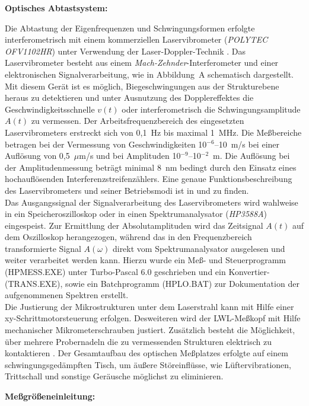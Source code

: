 {\bf Optisches Abtastsystem:}

Die Abtastung der Eigenfrequenzen und Schwingungsformen erfolgte
interferometrisch mit einem kommerziellen Laservibrometer
({\em POLYTEC OFV1102HR}) unter Verwendung der Laser-Doppler-Technik
\cite{Pol91}. Das Laservibrometer besteht aus einem
{\em Mach-Zehnder}-Interferometer und einer elektronischen
Signalverarbeitung, wie in Abbildung~A schematisch dargestellt.
Mit diesem Gerät ist es möglich, Biegeschwingungen aus der Strukturebene
heraus zu detektieren und unter Ausnutzung des Dopplereffektes die
Geschwindigkeitsschnelle $v(t)$ oder interferometrisch die
Schwingungsamplitude $A(t)$ zu vermessen.
Der Arbeitsfrequenzbereich des eingesetzten Laservibrometers erstreckt
sich von 0,1~Hz bis maximal 1~MHz. Die Meßbereiche betragen bei der
Vermessung von Geschwindigkeiten 10$^{-6}$--10~m/s bei einer Auflösung
von 0,5~$\mu$m/s und bei Amplituden 10$^{-9}$--10$^{-2}$~m. Die Auflösung
bei der Amplitudenmessung beträgt minimal 8~nm bedingt durch den Einsatz
eines hochauflösenden Interferenzstreifenzählers. Eine genaue
Funktionsbeschreibung des Laservibrometers und seiner Betriebsmodi ist in
\cite{Sel88} und \cite{Lew90} zu finden.\\
Das Ausgangssignal der Signalverarbeitung des Laservibrometers wird
wahlweise in ein Speicheroszilloskop oder in einen Spektrumanalysator
({\em HP3588A}) eingespeist. Zur Ermittlung der Absolutamplituden wird
das Zeitsignal
$A(t)$ auf dem Oszilloskop herangezogen, während das in den Frequenzbereich
transformierte Signal $A(\omega)$ direkt vom Spektrumanalysator
ausgelesen und weiter verarbeitet werden kann. Hierzu wurde ein
Meß- und Steuerprogramm ({\sf HPMESS.EXE}) unter {\sf Turbo-Pascal 6.0}
geschrieben \cite{Mue92} und ein Konvertier- ({\sf TRANS.EXE}), sowie
ein Batchprogramm ({\sf HPLO.BAT}) zur Dokumentation der aufgenommenen
Spektren erstellt.\\
Die Justierung der Mikrostrukturen unter dem Laserstrahl kann mit Hilfe
einer xy-Schrittmotorsteuerung erfolgen. Desweiteren wird der LWL-Meßkopf
mit Hilfe mechanischer Mikrometerschrauben justiert. Zusätzlich besteht die
Möglichkeit, über mehrere Probernadeln die zu vermessenden Strukturen
elektrisch zu kontaktieren \cite{Sch93a}.
Der Gesamtaufbau des optischen Meßplatzes erfolgte auf einem
schwingungsgedämpften Tisch, um äußere Störeinflüsse, wie
Lüftervibrationen, Trittschall und sonstige Geräusche möglichst zu
eliminieren.


{\bf Meßgrößeneinleitung:}

